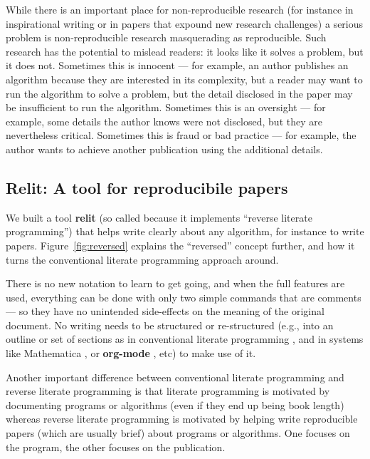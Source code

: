 \documentclass[preprint,times]{elsarticle}
\def\newend{\color{black}}
\def\new#1{#1}
\def\newend{}
\def\name#1{\textbf{#1}}
\begin{document}
While there is an important place for non-reproducible research (for instance in inspirational writing or in papers that expound new research challenges) a serious problem is non-reproducible research masquerading as reproducible. Such research has the potential to mislead readers: it looks like it solves a problem, but it does not. Sometimes this is innocent --- for example, an author publishes an algorithm because they are interested in its complexity, but a reader may want to run the algorithm to solve a problem, but the detail disclosed in the paper may be insufficient to run the algorithm. Sometimes this is an oversight --- for example, some details the author knows were not disclosed, but they are nevertheless critical. Sometimes this is fraud or bad practice --- for example, the author wants to achieve another publication using the additional details.
\newend

\subsection{Relit: A tool for reproducibile papers}
We built a tool \name{relit} (so called because it implements ``reverse literate programming'') that helps write clearly about any algorithm\new{, for instance to write papers}. Figure~\ref{fig:reversed} explains the ``reversed'' concept further\new{, and how it turns the conventional literate programming approach around.}

\new{There is no new notation to learn to get going, and when the full features are used, everything can be done with only two simple commands that are comments --- so they have no unintended side-effects on the meaning of the original document. No writing needs to be structured or re-structured (e.g., into an outline or set of sections as in conventional literate programming  \cite{litprog,noweb}, and in systems like  Mathematica \cite{mathematica}, or \name{org-mode} \cite{org-mode}, etc) to make use of it.}

\new{Another important difference between conventional literate programming and reverse literate programming is that literate programming is motivated by documenting programs or algorithms (even if they end up being book length) whereas reverse literate programming is motivated by helping write reproducible papers (which are usually brief) about programs or algorithms. One focuses on the program, the other focuses on the publication.}
\end{document}

